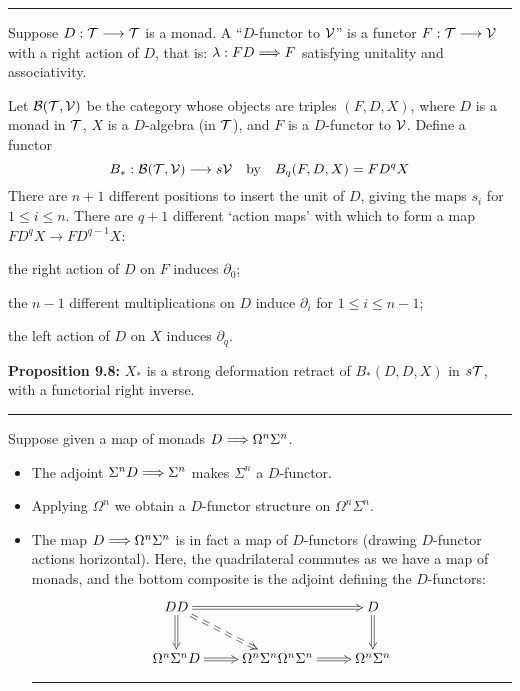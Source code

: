 \documentclass[11pt]{article}
\begin{document}
\begin{Operads}
\begin{itemise}
\hrule
\item Suppose $D:\mathcal{T}\longrightarrow\mathcal{T}$ is a monad. A ``$D$-functor to $\mathcal{V}$'' is a functor $F:\mathcal{T}\longrightarrow \mathcal{V}$ with a right action of $D$, that is: $\lambda:FD\Longrightarrow F$ satisfying unitality and associativity.
\item Let $\mathcal{B}(\mathcal{T},\mathcal{V})$ be the category whose objects are triples $(F,D,X)$, where $D$ is a monad in $\mathcal{T}$, $X$ is a $D$-algebra (in $\mathcal{T}$), and $F$ is a $D$-functor to $\mathcal{V}$. Define a functor
\[B_*:\mathcal{B}(\mathcal{T},\mathcal{V})\longrightarrow s\mathcal{V}\textup{\quad by\quad}B_q(F,D,X)=FD^qX\]
There are $n+1$ different positions to insert the unit of $D$, giving the maps $s_i$ for $1\leq i\leq n$. There are $q+1$ different `action maps' with which to form a map $FD^qX\to FD^{q-1}X$: 
\begin{itemise}
\item the right action of $D$ on $F$ induces $\partial_0$;
\item the $n-1$ different multiplications on $D$ induce $\partial_i$ for $1\leq i\leq n-1$;
\item the left action of $D$ on $X$ induces $\partial_q$.
\end{itemise}
\item \textbf{Proposition 9.8:} $X_*$ is a strong deformation retract of $B_*(D,D,X)$ in $s\mathcal{T}$, with a functorial right inverse.
\hrule
\item Suppose given a map of monads $D\Longrightarrow\Omega^n\Sigma^n$.
\begin{itemize}\squishlist
\item The adjoint $\Sigma^nD\Longrightarrow\Sigma^n$ makes $\Sigma^n$ a $D$-functor.
\item Applying $\Omega^n$ we obtain a $D$-functor structure on $\Omega^n\Sigma^n$.
\item The map $D\Longrightarrow\Omega^n\Sigma^n$ is in fact a map of $D$-functors (drawing $D$-functor actions horizontal). Here, the quadrilateral commutes as we have a map of monads, and the bottom composite is the adjoint defining the $D$-functors:
\[\xymatrix{
DD\ar@{=>}[rr]\ar@{==>}[rd]\ar@{=>}[d]&&D\ar@{=>}[d]\\
\Omega^n\Sigma^nD\ar@{=>}[r]&
\Omega^n\Sigma^n\Omega^n\Sigma^n\ar@{=>}[r]&\Omega^n\Sigma^n
}\]
\hrule
\end{itemize}




\end{itemise}
\end{Operads}
\end{document}
